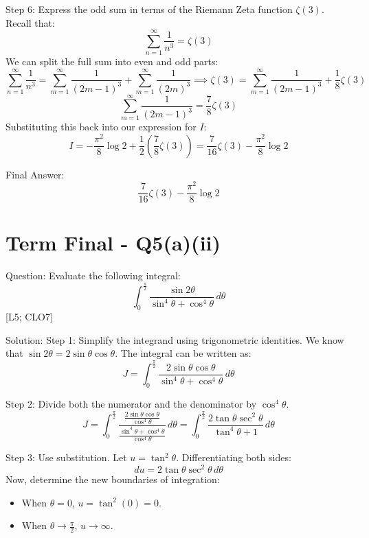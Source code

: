 \documentclass[11pt, a4paper]{article}
\begin{document}
Step 6: Express the odd sum in terms of the Riemann Zeta function $\zeta(3)$.
Recall that:
\[
\sum_{n=1}^{\infty} \frac{1}{n^3} = \zeta(3)
\]
We can split the full sum into even and odd parts:
\[
\sum_{n=1}^{\infty} \frac{1}{n^3} = \sum_{m=1}^{\infty} \frac{1}{(2m-1)^3} + \sum_{m=1}^{\infty} \frac{1}{(2m)^3} \implies \zeta(3) = \sum_{m=1}^{\infty} \frac{1}{(2m-1)^3} + \frac{1}{8} \zeta(3)
\]
\[
\sum_{m=1}^{\infty} \frac{1}{(2m-1)^3} = \frac{7}{8} \zeta(3)
\]
Substituting this back into our expression for $I$:
\[
I = -\frac{\pi^2}{8} \log 2 + \frac{1}{2} \left( \frac{7}{8} \zeta(3) \right) = \frac{7}{16} \zeta(3) - \frac{\pi^2}{8} \log 2
\]

Final Answer:
\[
\boxed{\frac{7}{16} \zeta(3) - \frac{\pi^2}{8} \log 2}
\]





\section*{Term Final - Q5(a)(ii)}

Question:
Evaluate the following integral:
\[
\int_{0}^{\frac{\pi}{2}} \frac{\sin 2\theta}{\sin^4 \theta + \cos^4 \theta} \, d\theta
\]
[L5; CLO7]

Solution:
Step 1: Simplify the integrand using trigonometric identities.
We know that $\sin 2\theta = 2 \sin \theta \cos \theta$. The integral can be written as:
\[
J = \int_{0}^{\frac{\pi}{2}} \frac{2 \sin \theta \cos \theta}{\sin^4 \theta + \cos^4 \theta} \, d\theta
\]

Step 2: Divide both the numerator and the denominator by $\cos^4 \theta$.
\[
J = \int_{0}^{\frac{\pi}{2}} \frac{\frac{2 \sin \theta \cos \theta}{\cos^4 \theta}}{\frac{\sin^4 \theta + \cos^4 \theta}{\cos^4 \theta}} \, d\theta = \int_{0}^{\frac{\pi}{2}} \frac{2 \tan \theta \sec^2 \theta}{\tan^4 \theta + 1} \, d\theta
\]

Step 3: Use substitution.
Let $u = \tan^2 \theta$.
Differentiating both sides:
\[
du = 2 \tan \theta \sec^2 \theta \, d\theta
\]
Now, determine the new boundaries of integration:
\begin{itemize}
    \item When $\theta = 0$, $u = \tan^2(0) = 0$.
    \item When $\theta \to \frac{\pi}{2}$, $u \to \infty$.
\end{itemize}
\end{document}
